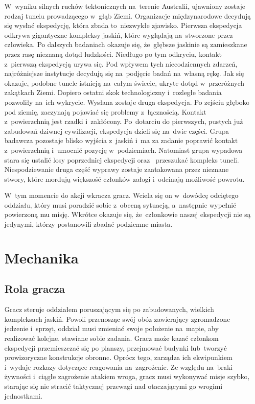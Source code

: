 \documentclass[licencjacka]{pracamgr}
\begin{document}
    W~wyniku silnych ruchów tektonicznych na~terenie Australii, ujawniony zostaje rodzaj tunelu
    prowadzącego w~głąb Ziemi. Organizacje międzynarodowe decydują się wysłać ekspedycję, która zbada to~niezwykłe
    zjawisko. Pierwsza ekspedycja odkrywa gigantyczne kompleksy jaskiń, które wyglądają na~stworzone przez człowieka.
    Po dalszych badaniach okazuje się, że~głębsze jaskinie są zamieszkane przez rasę nieznaną dotąd ludzkości. Niedługo
    po tym odkryciu, kontakt z~pierwszą ekspedycją urywa się. Pod wpływem tych niecodziennych zdarzeń, najróżniejsze
    instytucje decydują się na~podjęcie badań na~własną rękę. Jak się okazuje, podobne tunele istnieją na~całym świecie,
    ukryte dotąd w~przeróżnych zakątkach Ziemi. Dopiero ostatni skok technologiczny i~rozległe badania pozwoliły na~ich 
    wykrycie. Wysłana zostaje druga ekspedycja. Po zejściu głęboko pod ziemię, zaczynają pojawiać się problemy z~łącznością.
    Kontakt z~powierzchnią jest rzadki i~zakłócony. Po~dotarciu do pierwszych, pustych już zabudowań dziwnej cywilizacji,
    ekspedycja dzieli się na~dwie części. Grupa badawcza pozostaje blisko wyjścia z~jaskiń i~ma za zadanie poprawić
    kontakt z~powierzchnią i~umocnić pozycję w~podziemiach. Natomiast grupa wypadowa stara się ustalić losy poprzedniej
    ekspedycji oraz~ przeszukać kompleks tuneli. Niespodziewanie druga część wyprawy zostaje zaatakowana przez nieznane stwory,
    które mordują większość członków załogi i~odcinają możliwość powrotu.

    W~tym momencie do akcji wkracza gracz. Wciela się on w~dowódcę odciętego oddziału, który musi poradzić sobie z~obecną
    sytuacją, a~następnie wypełnić powierzoną mu misję. Wkrótce okazuje się, że~członkowie naszej ekspedycji nie są jedynymi,
    którzy postanowili zbadać podziemne miasta.

  \section{Mechanika}
    \subsection{Rola gracza}
      Gracz steruje oddziałem poruszającym się po zabudowanych, wielkich kompleksach jaskiń. Powoli przenosząc swój obóz zawierający
      zgromadzone jedzenie i~sprzęt, oddział musi zmieniać swoje położenie na~mapie, aby realizować kolejne, stawiane sobie zadania.
      Gracz może kazać członkom ekspedycji przemieszczać się po planszy, przejmować budynki lub~tworzyć prowizoryczne konstrukcje obronne.
      Oprócz tego, zarządza ich ekwipunkiem i~wydaje rozkazy dotyczące reagowania na~zagrożenie. Ze względu na~braki żywności
      i~ciągłe zagrożenie atakiem wroga, gracz musi wykonywać misje szybko, starając się nie stracić taktycznej przewagi nad
      otaczającymi go wrogimi jednostkami.
\end{document}
